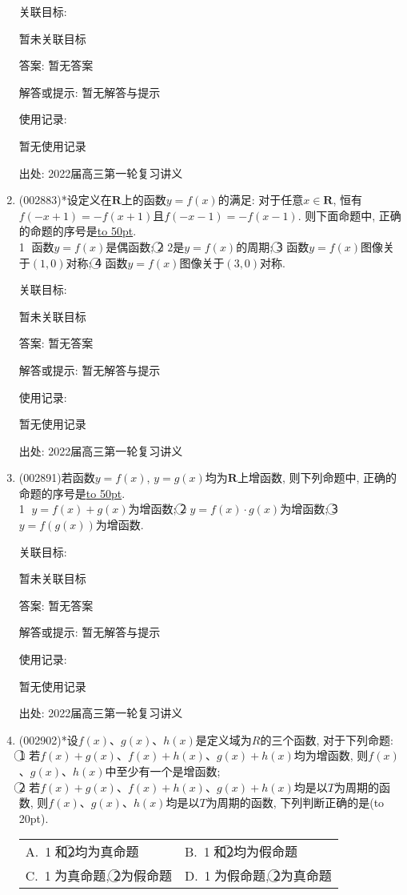 \documentclass[10pt,a4paper]{article}
\newcommand{\blank}[1]{\underline{\hbox to #1pt{}}}
\newcommand{\bracket}[1]{(\hbox to #1pt{})}
\newcommand{\twoch}[4]{\par\begin{tabular}{p{.46\textwidth}p{.46\textwidth}}
A.~#1& B.~#2\\
C.~#3& D.~#4
\end{tabular}}
\begin{document}
\begin{enumerate}[1.]
关联目标:

暂未关联目标

答案: 暂无答案

解答或提示: 暂无解答与提示

使用记录:

暂无使用记录


出处: 2022届高三第一轮复习讲义
\item { (002883)}*设定义在$\mathbf{R}$上的函数$y=f(x)$的满足: 对于任意$x\in \mathbf{R}$, 恒有$f(-x+1)=-f(x+1)$且$f(-x-1)=-f(x-1)$. 则下面命题中, 正确的命题的序号是\blank{50}.\\
\textcircled{1} 函数$y=f(x)$是偶函数; \textcircled{2} $2$是$y=f(x)$的周期; \textcircled{3} 函数$y=f(x)$图像关于$(1,0)$对称; \textcircled{4} 函数$y=f(x)$图像关于$(3,0)$对称.


关联目标:

暂未关联目标

答案: 暂无答案

解答或提示: 暂无解答与提示

使用记录:

暂无使用记录


出处: 2022届高三第一轮复习讲义
\item { (002891)}若函数$y=f(x)$, $y=g(x)$均为$\mathbf{R}$上增函数, 则下列命题中, 正确的命题的序号是\blank{50}.\\
\textcircled{1} $y=f(x)+g(x)$为增函数; \textcircled{2} $y=f(x)\cdot g(x)$为增函数; \textcircled{3} $y=f(g(x))$为增函数.


关联目标:

暂未关联目标

答案: 暂无答案

解答或提示: 暂无解答与提示

使用记录:

暂无使用记录


出处: 2022届高三第一轮复习讲义
\item { (002902)}*设$f(x)$、$g(x)$、$h(x)$是定义域为$R$的三个函数, 对于下列命题:\\
\textcircled{1} 若$f(x)+g(x)$、$f(x)+h(x)$、$g(x)+h(x)$均为增函数, 则$f(x)$、$g(x)$、$h(x)$中至少有一个是增函数;\\
\textcircled{2} 若$f(x)+g(x)$、$f(x)+h(x)$、$g(x)+h(x)$均是以$T$为周期的函数, 则$f(x)$、$g(x)$、$h(x)$均是以$T$为周期的函数, 下列判断正确的是\bracket{20}.
\twoch{\textcircled{1}和\textcircled{2}均为真命题}{\textcircled{1}和\textcircled{2}均为假命题}{\textcircled{1}为真命题, \textcircled{2}为假命题}{\textcircled{1}为假命题, \textcircled{2}为真命题}



\end{enumerate}
\end{document}
